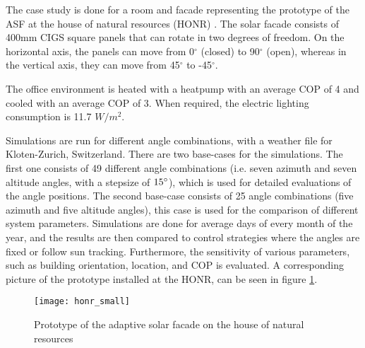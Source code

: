 		The case study is done for a room and facade representing the prototype of the ASF at the house of natural resources (HONR) \cite{nagy2015frontiers}.  The solar facade consists of 400mm CIGS square panels that can rotate in two degrees of freedom. On the horizontal axis, the panels can move from 0$^{\circ}$ (closed) to 90$^{\circ}$ (open), whereas in the vertical axis, they can move from 45$^{\circ}$ to -45$^{\circ}$. %

		The office environment is heated with a heatpump with an average COP of 4 and cooled with an average COP of 3. When required, the electric lighting consumption is 11.7 $W/m^2$. 


		Simulations are run for different angle combinations, with a weather file for Kloten-Zurich, Switzerland. There are two base-cases for the simulations. The first one consists of 49 different angle combinations (i.e. seven azimuth and seven altitude angles, with a stepsize of $15\degree$), which is used for detailed evaluations of the angle positions. The second base-case consists of 25 angle combinations (five azimuth and five altitude angles), this case is used for the comparison of different system parameters. Simulations are done for average days of every month of the year, and the results are then compared to control strategies where the angles are fixed or follow sun tracking. Furthermore, the sensitivity of various parameters, such as building orientation, location, and COP is evaluated. A corresponding picture of the prototype installed at the HONR, can be seen in figure \ref{fig:honr}. 

		\begin{figure}[ht] %
			\begin{center}
			\texttt{[image: honr\_small]}
			\caption{Prototype of the adaptive solar facade on the house of natural resources}
			\label{fig:honr}
			\end{center} 
		\end{figure}



